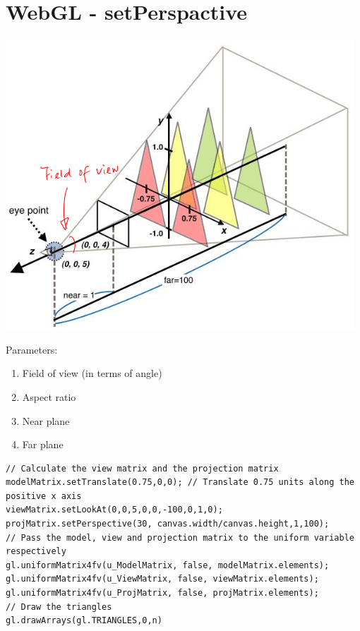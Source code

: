 \documentclass{article}[18pt]
\begin{document}
\section{WebGL - setPerspactive}
\begin{center}
	\includegraphics[scale=0.7]{setperspective}
\end{center}
Parameters:
\begin{enumerate}
	\item Field of view (in terms of angle)
	\item Aspect ratio
	\item Near plane
	\item Far plane
\end{enumerate}
\begin{verbatim}
// Calculate the view matrix and the projection matrix
modelMatrix.setTranslate(0.75,0,0); // Translate 0.75 units along the positive x axis
viewMatrix.setLookAt(0,0,5,0,0,-100,0,1,0);
projMatrix.setPerspective(30, canvas.width/canvas.height,1,100);
// Pass the model, view and projection matrix to the uniform variable respectively
gl.uniformMatrix4fv(u_ModelMatrix, false, modelMatrix.elements);
gl.uniformMatrix4fv(u_ViewMatrix, false, viewMatrix.elements);
gl.uniformMatrix4fv(u_ProjMatrix, false, projMatrix.elements);
// Draw the triangles
gl.drawArrays(gl.TRIANGLES,0,n)
\end{verbatim}
\end{document}

